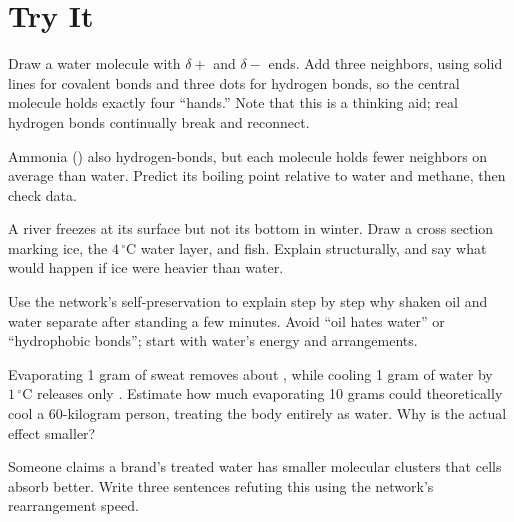 \section*{Try It}

\begin{sikaoti}
\item Draw a water molecule with $\delta+$ and $\delta-$ ends. Add three neighbors, using solid lines for covalent bonds and three dots for hydrogen bonds, so the central molecule holds exactly four ``hands.'' Note that this is a thinking aid; real hydrogen bonds continually break and reconnect.
\item Ammonia () also hydrogen-bonds, but each molecule holds fewer neighbors on average than water. Predict its boiling point relative to water and methane, then check data.
\item A river freezes at its surface but not its bottom in winter. Draw a cross section marking ice, the $4\,^{\circ}\mathrm{C}$ water layer, and fish. Explain structurally, and say what would happen if ice were heavier than water.
\item Use the network's self-preservation to explain step by step why shaken oil and water separate after standing a few minutes. Avoid ``oil hates water'' or ``hydrophobic bonds''; start with water's energy and arrangements.
\item Evaporating 1 gram of sweat removes about , while cooling 1 gram of water by $1\,^{\circ}\mathrm{C}$ releases only . Estimate how much evaporating 10 grams could theoretically cool a 60-kilogram person, treating the body entirely as water. Why is the actual effect smaller?
\item Someone claims a brand's treated water has smaller molecular clusters that cells absorb better. Write three sentences refuting this using the network's rearrangement speed.
\end{sikaoti}
